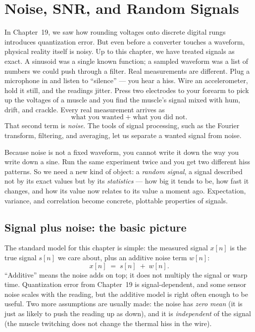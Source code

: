 \chapter{Noise, SNR, and Random Signals}

In Chapter~19, we saw how rounding voltages onto discrete digital rungs introduces
quantization error. But even before a converter touches a waveform, physical reality
itself is noisy. Up to this chapter, we have treated signals as exact. 
A sinusoid was a single known function; a sampled waveform was a list of
numbers we could push through a filter. Real measurements are different. Plug a microphone in
and listen to ``silence'' --- you hear a hiss. Wire an accelerometer, hold it still, and the readings jitter. Press two electrodes to your forearm to pick up the
voltages of a muscle and you find the muscle's signal mixed with
hum, drift, and crackle. Every real measurement arrives as
\[
  \text{what you wanted} \;+\; \text{what you did not.}
\]
That second term is \emph{noise}. The tools of signal processing, such as the
Fourier transform, filtering, and averaging, let us separate a wanted signal from noise.

Because noise is not a fixed waveform, you cannot
write it down the way you write down a sine. Run the same experiment
twice and you get two different hiss patterns. So we need a new kind of object:
a \emph{random signal}, a signal described not by its exact values but by its
\emph{statistics} --- how big it tends to be, how fast it changes, and how its value
now relates to its value a moment ago. Expectation, variance, and correlation
become concrete, plottable properties of signals.

\section{Signal plus noise: the basic picture}
\label{ch20:sig-plus-noise}

The standard model for this chapter is simple: the measured signal $x[n]$ is the true signal $s[n]$ we care about,
plus an additive noise term $w[n]$:
\begin{equation}
  x[n] \;=\; s[n] \;+\; w[n].
  \label{ch20:additive}
\end{equation}
``Additive'' means the noise adds on top; it does not multiply the
signal or warp time. Quantization
error from Chapter~19 is signal-dependent, and some sensor noise scales with the
reading, but the additive model is right often enough to be useful. Two more assumptions are usually made: the noise has \emph{zero
mean} (it is just as likely to push the reading up as down), and it is
\emph{independent} of the signal (the muscle twitching does not change the
thermal hiss in the wire).


